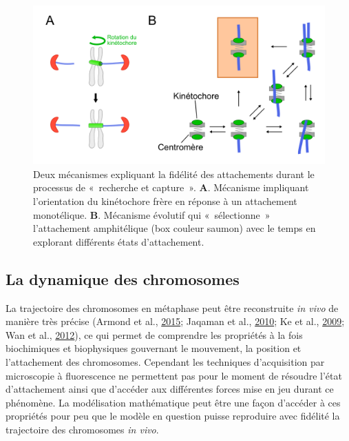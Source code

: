 \documentclass[12pt,a4paper,twoside,openright]{book}
\begin{document}
\begin{figure}[htbp]
\centering
\includegraphics{figures/intro/spindle_assembly.png}
\caption{\label{fig:spindle_assembly}Deux mécanismes expliquant la
fidélité des attachements durant le processus de «~recherche et
capture~». \textbf{A}. Mécanisme impliquant l'orientation du kinétochore
frère en réponse à un attachement monotélique. \textbf{B}. Mécanisme
évolutif qui «~sélectionne~» l'attachement amphitélique (box couleur
saumon) avec le temps en explorant différents états d'attachement.}
\end{figure}

\subsection{La dynamique des
chromosomes}\label{la-dynamique-des-chromosomes}

\label{sec:force-gen}

La trajectoire des chromosomes en métaphase peut être reconstruite
\emph{in vivo} de manière très précise (Armond et al.,
\protect\hyperlink{ref-Armond2015}{2015}; Jaqaman et al.,
\protect\hyperlink{ref-Jaqaman2010}{2010}; Ke et al.,
\protect\hyperlink{ref-Ke2009}{2009}; Wan et al.,
\protect\hyperlink{ref-Wan2012}{2012}), ce qui permet de comprendre les
propriétés à la fois biochimiques et biophysiques gouvernant le
mouvement, la position et l'attachement des chromosomes. Cependant les
techniques d'acquisition par microscopie à fluorescence ne permettent
pas pour le moment de résoudre l'état d'attachement ainsi que d'accéder
aux différentes forces mise en jeu durant ce phénomène. La modélisation
mathématique peut être une façon d'accéder à ces propriétés pour peu que
le modèle en question puisse reproduire avec fidélité la trajectoire des
chromosomes \emph{in vivo}.
\end{document}
